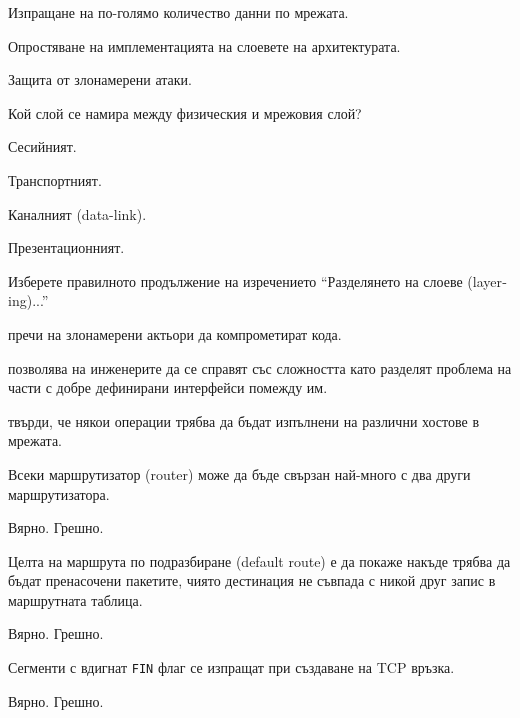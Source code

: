 \begin{questions}
\begin{choices}
    \choice Изпращане на по-голямо количество данни по мрежата.

    \CorrectChoice Опростяване на имплементацията на слоевете на архитектурата.

    \choice Защита от злонамерени атаки.
  \end{choices}

  \question[6] Кой слой се намира между физическия и мрежовия слой?
  \begin{oneparchoices}
    \choice Сесийният.

    \choice Транспортният.

    \CorrectChoice Каналният (\foreignlanguage{english}{data-link}).

    \choice Презентационният.
  \end{oneparchoices}

  \question[6] Изберете правилното продължение на изречението "`Разделянето на
  слоеве (\foreignlanguage{english}{layering})..."'
  \begin{choices}
    \choice пречи на злонамерени актьори да компрометират кода.

    \choice позволява на инженерите да се справят със сложността като
    разделят проблема на части с добре дефинирани интерфейси помежду им.

    \choice твърди, че някои операции трябва да бъдат изпълнени на различни
    хостове в мрежата.
  \end{choices}

  \question[6] Всеки маршрутизатор (\foreignlanguage{english}{router}) може да
  бъде свързан най-много с два други маршрутизатора.
  \begin{oneparchoices}
    \choice Вярно.
    \CorrectChoice Грешно.
  \end{oneparchoices}

  \question[6] Целта на маршрута по подразбиране
  (\foreignlanguage{english}{default route}) е да покаже накъде трябва да бъдат
  пренасочени пакетите, чиято дестинация не съвпада с никой друг запис в
  маршрутната таблица.
  \begin{oneparchoices}
    \CorrectChoice Вярно.
    \choice Грешно.
  \end{oneparchoices}

  \question[6] Сегменти с вдигнат \texttt{FIN} флаг се изпращат при създаване на
  TCP връзка.
  \begin{oneparchoices}
    \choice Вярно.
    \CorrectChoice Грешно.
  \end{oneparchoices}


\end{questions}
